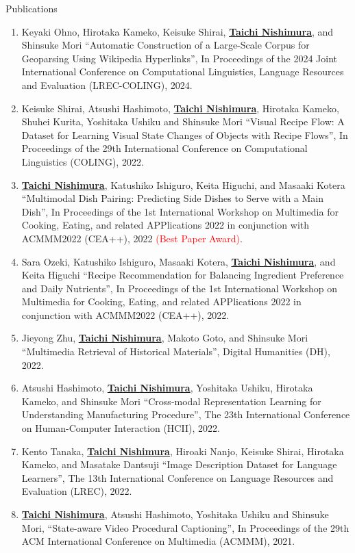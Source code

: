 \begin{rSection}{Publications}
\begin{enumerate}
    \item Keyaki Ohno, Hirotaka Kameko, Keisuke Shirai, \underline{{\bf Taichi Nishimura}}, and Shinsuke Mori ``Automatic Construction of a Large-Scale Corpus for Geoparsing Using Wikipedia Hyperlinks'', In Proceedings of the 2024 Joint International Conference on Computational Linguistics, Language Resources and Evaluation (LREC-COLING), 2024.
    \item Keisuke Shirai, Atsushi Hashimoto, \underline{{\bf Taichi Nishimura}}, Hirotaka Kameko, Shuhei Kurita, Yoshitaka Ushiku and Shinsuke Mori ``Visual Recipe Flow: A Dataset for Learning Visual State Changes of Objects with Recipe Flows'', In Proceedings of the 29th International Conference on Computational Linguistics (COLING), 2022.
    \item \underline{{\bf Taichi Nishimura}}, Katushiko Ishiguro, Keita Higuchi, and Masaaki Kotera ``Multimodal Dish Pairing: Predicting Side Dishes to Serve with a Main Dish'', In Proceedings of the 1st International Workshop on Multimedia for Cooking, Eating, and related APPlications 2022 in conjunction with ACMMM2022 (CEA++), 2022 \textcolor{red}{(Best Paper Award)}.
    \item Sara Ozeki, Katushiko Ishiguro, Masaaki Kotera, \underline{{\bf Taichi Nishimura}}, and Keita Higuchi ``Recipe Recommendation for Balancing Ingredient Preference and Daily Nutrients'', In Proceedings of the 1st International Workshop on Multimedia for Cooking, Eating, and related APPlications 2022 in conjunction with ACMMM2022 (CEA++), 2022.
    \item Jieyong Zhu, \underline{{\bf Taichi Nishimura}}, Makoto Goto, and Shinsuke Mori ``Multimedia Retrieval of Historical Materials'', Digital Humanities (DH), 2022.
    \item Atsushi Hashimoto, \underline{{\bf Taichi Nishimura}}, Yoshitaka Ushiku, Hirotaka Kameko, and Shinsuke Mori ``Cross-modal Representation Learning for Understanding Manufacturing Procedure'', The 23th International Conference on Human-Computer Interaction (HCII), 2022.
    \item Kento Tanaka, \underline{{\bf Taichi Nishimura}}, Hiroaki Nanjo, Keisuke Shirai, Hirotaka Kameko, and Masatake Dantsuji ``Image Description Dataset for Language Learners'', The 13th International Conference on Language Resources and Evaluation (LREC), 2022.
    \item \underline{{\bf Taichi Nishimura}}, Atsushi Hashimoto, Yoshitaka Ushiku and Shinsuke Mori, ``State-aware Video Procedural Captioning'', In Proceedings of the 29th ACM International Conference on Multimedia (ACMMM), 2021.

\end{enumerate}
\end{rSection}
